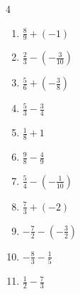 \begin{multicols}{4}
\begin{enumerate}

  \item $\displaystyle \frac{8}{9} + \left(-1\right)$


\columnbreak %

  \item $\displaystyle \frac{2}{3} - \left(-\frac{3}{10}\right)$


  \item $\displaystyle \frac{5}{6} + \left(-\frac{3}{8}\right)$


  \item $\displaystyle \frac{5}{3} - \frac{3}{4}$


  \item $\displaystyle \frac{1}{8} + 1$


  \item $\displaystyle \frac{9}{8} - \frac{4}{9}$


  \item $\displaystyle \frac{5}{4} - \left(-\frac{1}{10}\right)$


  \item $\displaystyle \frac{7}{3} + \left(-2\right)$


  \item $\displaystyle -\frac{7}{2} - \left(-\frac{3}{2}\right)$

        \phantom{$\displaystyle =-2$}

  \item $\displaystyle -\frac{8}{3} - \frac{1}{5}$


  \item $\displaystyle \frac{1}{2} - \frac{7}{3}$



\end{enumerate}
\end{multicols}
